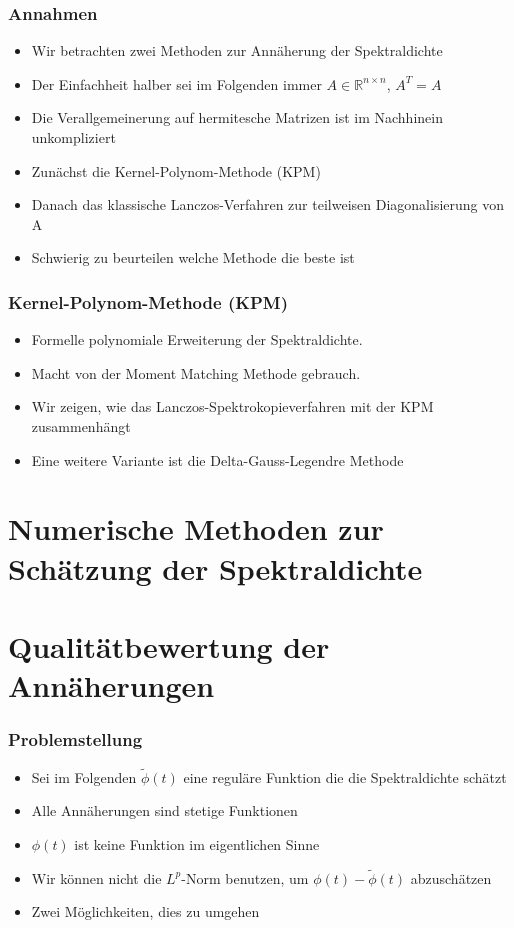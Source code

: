 \documentclass{beamer}
\newcommand{\R}{\mathbb{R}}
\begin{document}
\begin{frame}
    \frametitle{Annahmen}
    \begin{itemize}
        \item Wir betrachten zwei Methoden zur Annäherung der Spektraldichte
        \item Der Einfachheit halber sei im Folgenden immer $A \in \R^{n \times n}$, $A^T = A$
        \item Die Verallgemeinerung auf hermitesche Matrizen ist im Nachhinein unkompliziert
        \item Zunächst die Kernel-Polynom-Methode (KPM)
        \item Danach das klassische Lanczos-Verfahren zur teilweisen Diagonalisierung von A
        \item Schwierig zu beurteilen welche Methode die beste ist
    \end{itemize}
\end{frame}

\begin{frame}
    \frametitle{Kernel-Polynom-Methode (KPM)}
    \begin{itemize}
        \item Formelle polynomiale Erweiterung der Spektraldichte.
        \item Macht von der Moment Matching Methode gebrauch.
        \item Wir zeigen, wie das Lanczos-Spektrokopieverfahren mit der KPM zusammenhängt
        \item Eine weitere Variante ist die Delta-Gauss-Legendre Methode
    \end{itemize}
\end{frame}

\section{Numerische Methoden zur Schätzung der Spektraldichte}

\section{Qualitätbewertung der Annäherungen}

\begin{frame}
    \frametitle{Problemstellung}
    \begin{itemize}
        \item Sei im Folgenden $\tilde{\phi}(t)$ eine reguläre Funktion die die Spektraldichte schätzt
        \item Alle Annäherungen sind stetige Funktionen
        \item $\phi(t)$ ist keine Funktion im eigentlichen Sinne
        \item Wir können nicht die $L^p$-Norm benutzen, um $\phi(t) - \tilde{\phi}(t)$ abzuschätzen
        \item Zwei Möglichkeiten, dies zu umgehen
    \end{itemize}
\end{frame}
\end{document}
